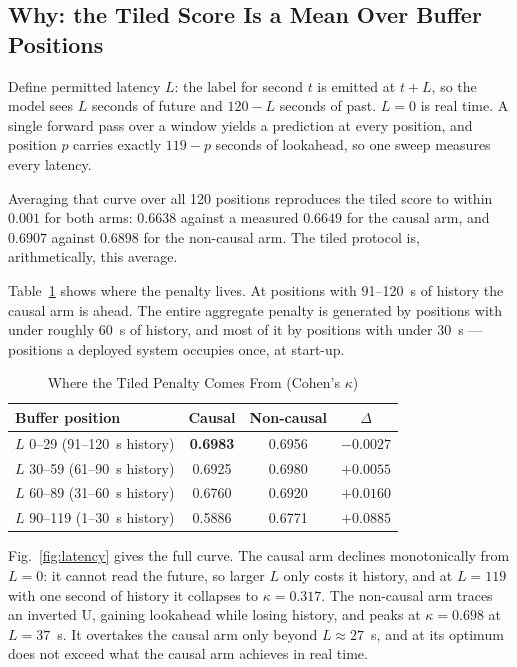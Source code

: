 \documentclass[conference]{IEEEtran}
\begin{document}
\subsection{Why: the Tiled Score Is a Mean Over Buffer Positions}

Define permitted latency $L$: the label for second $t$ is emitted at $t+L$, so the model sees $L$
seconds of future and $120 - L$ seconds of past. $L = 0$ is real time. A single forward pass over a
window yields a prediction at every position, and position $p$ carries exactly $119 - p$ seconds of
lookahead, so one sweep measures every latency.

Averaging that curve over all 120 positions reproduces the tiled score to within $0.001$ for both
arms: $0.6638$ against a measured $0.6649$ for the causal arm, and $0.6907$ against $0.6898$ for the
non-causal arm. The tiled protocol is, arithmetically, this average.

Table~\ref{tab:quartile} shows where the penalty lives. At positions with 91--120~s of history the
causal arm is ahead. The entire aggregate penalty is generated by positions with under roughly 60~s
of history, and most of it by positions with under 30~s --- positions a deployed system occupies
once, at start-up.

\begin{table}[t]
\caption{Where the Tiled Penalty Comes From (Cohen's $\kappa$)}
\label{tab:quartile}
\centering
\begin{tabular}{lccc}
\toprule
Buffer position & Causal & Non-causal & $\Delta$ \\
\midrule
$L$ 0--29\hphantom{0} (91--120~s history) & \textbf{0.6983} & 0.6956 & $-0.0027$ \\
$L$ 30--59 (61--90~s history)             & 0.6925 & 0.6980 & $+0.0055$ \\
$L$ 60--89 (31--60~s history)             & 0.6760 & 0.6920 & $+0.0160$ \\
$L$ 90--119 (1--30~s history)             & 0.5886 & 0.6771 & $+0.0885$ \\
\bottomrule
\end{tabular}
\end{table}

Fig.~\ref{fig:latency} gives the full curve. The causal arm declines monotonically from $L = 0$: it
cannot read the future, so larger $L$ only costs it history, and at $L = 119$ with one second of
history it collapses to $\kappa = 0.317$. The non-causal arm traces an inverted U, gaining lookahead
while losing history, and peaks at $\kappa = 0.698$ at $L = 37$~s. It overtakes the causal arm only
beyond $L \approx 27$~s, and at its optimum does not exceed what the causal arm achieves in real
time.
\end{document}
